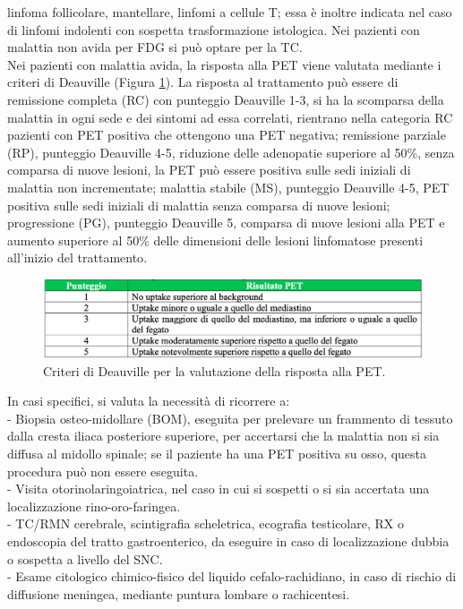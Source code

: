 linfoma follicolare, mantellare, linfomi a cellule T; essa è inoltre indicata nel caso di linfomi indolenti con 
sospetta trasformazione istologica. Nei pazienti con malattia non avida per FDG si può optare per la TC\cite{reteveneta}.\\ 
Nei pazienti con malattia avida, la risposta alla PET viene valutata mediante i criteri di Deauville 
(Figura \ref{fig:FIGURE_2.19}). 
La risposta al trattamento può essere di remissione completa (RC) con punteggio Deauville 1-3, si ha 
la scomparsa della malattia in ogni sede e dei sintomi ad essa correlati, rientrano nella categoria RC pazienti 
con PET positiva che ottengono una PET negativa; remissione parziale (RP), punteggio Deauville 4-5, riduzione 
delle adenopatie superiore al 50\%, senza comparsa di nuove lesioni, la PET può essere positiva sulle sedi iniziali 
di malattia non incrementate; malattia stabile (MS), punteggio Deauville 4-5, PET positiva sulle sedi iniziali di 
malattia senza comparsa di nuove lesioni; progressione (PG), punteggio Deauville 5, comparsa di nuove lesioni 
alla PET e aumento superiore al 50\% delle dimensioni delle lesioni linfomatose presenti all’inizio del trattamento\cite{AIOM}.\\

\begin{figure}[H]
    \begin{center}
    \includegraphics[width=0.9\columnwidth]{img/DEAUVILLE.png}
    \vspace{-3mm}
    \end{center}
    \caption{Criteri di Deauville per la valutazione della risposta alla PET.
    \cite{AIOM}}
    \label{fig:FIGURE_2.19}
\end{figure}

In casi specifici, si valuta la necessità di ricorrere a:\\ 
- Biopsia osteo-midollare (BOM), eseguita per prelevare un frammento di tessuto dalla cresta iliaca posteriore 
superiore, per accertarsi che la malattia non si sia diffusa al midollo spinale; se il paziente ha una PET positiva 
su osso, questa procedura può non essere eseguita.\\
- Visita otorinolaringoiatrica, nel caso in cui si sospetti o si sia accertata una localizzazione rino-oro-faringea.\\
- TC/RMN cerebrale, scintigrafia scheletrica, ecografia testicolare, RX o endoscopia del tratto gastroenterico, 
da eseguire in caso di localizzazione dubbia o sospetta a livello del SNC.\\
- Esame citologico chimico-fisico del liquido cefalo-rachidiano, in caso di rischio di diffusione meningea, 
mediante puntura lombare o rachicentesi\cite{AIOM}.\\






